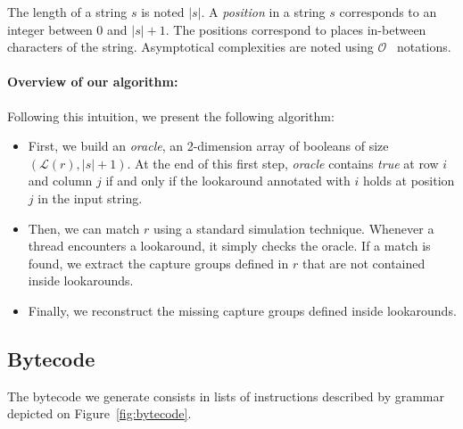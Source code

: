 \documentclass{article}
\def\size#1{\ensuremath{|#1|}}
\def\looknb#1{\ensuremath{\mathcal{L}(#1)}}
\def\bigo{\ensuremath{\mathcal{O}}}
\begin{document}
The length of a string $s$ is noted \size{s}.
A \textit{position} in a string $s$ corresponds to an integer between 0 and $\size{s}+1$.
The positions correspond to places in-between characters of the string.
Asymptotical complexities are noted using \bigo~ notations.



\paragraph{Overview of our algorithm:}

Following this intuition, we present the following algorithm:

\begin{itemize}
\item First, we build an \textit{oracle}, an 2-dimension array of booleans of size $(\looknb{r}, \size{s}+1)$.
  At the end of this first step, \textit{oracle} contains \textit{true} at row $i$ and column $j$ if and only if the lookaround annotated with $i$ holds at position $j$ in the input string.
\item Then, we can match $r$ using a standard simulation technique. Whenever a thread encounters a lookaround, it simply checks the oracle. If a match is found, we extract the capture groups defined in $r$ that are not contained inside lookarounds.
\item Finally, we reconstruct the missing capture groups defined inside lookarounds.
\end{itemize}

  
\subsection{Bytecode}

The bytecode we generate consists in lists of instructions described by grammar depicted on Figure~\ref{fig:bytecode}.

\def\instr{\ensuremath{\mathit{e}}}
\def\lbl{\ensuremath{\mathit{l}}}
\def\reg{\ensuremath{\mathit{reg}}}
\def\lid{\ensuremath{\mathit{lid}}}
\end{document}
